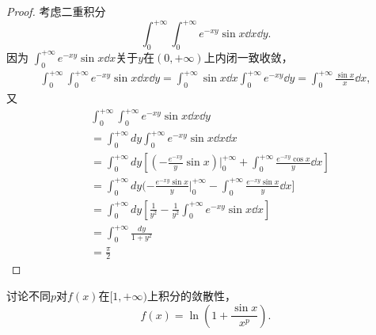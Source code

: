 \begin{proof}
考虑二重积分
$$\int_0^{+\infty}\int_0^{+\infty}e^{-xy}\sin x\dd x\dd y.$$
因为 $\int_0^{+\infty}e^{-xy}\sin x\dd x$关于$y$在$(0,+\infty)$上内闭一致收敛，
\begin{align*}
  \int_0^{+\infty}\int_0^{+\infty}e^{-xy}\sin x\dd x\dd y
  =\int_0^{+\infty}\sin x\dd x\int_0^{+\infty}e^{-xy}\dd y 
  =\int_0^{+\infty}\frac{\sin x}x\dd x,
\end{align*}
  又
\begin{align*}
  &\int_0^{+\infty}\int_0^{+\infty}e^{-xy}\sin x\dd x\dd y\\
  &=\int_0^{+\infty}dy\int_0^{+\infty}e^{-xy}\sin x\dd x\dd x\\
  &=\int_0^{+\infty}dy[(-\frac{e^{-xy}}{y}\sin x)|_0^{+\infty}+\int_0^{+\infty}\frac{e^{-xy}\cos x}{y}\dd x]\\
  &=\int_0^{+\infty}dy(-\frac{e^{-xy}\sin x}{y}|_0^{+\infty}-\int_0^{+\infty}\frac{e^{-xy}\sin x}{y}\dd x]\\
  &=\int_0^{+\infty}dy[\frac{1}{y^2}-\frac{1}{y^2}\int_0^{+\infty}e^{-xy}\sin x\dd x]\\
  &=\int_0^{+\infty}\frac{dy}{1+y^2}\\
  &=\frac{\pi}{2}
\end{align*}   
\end{proof}

\begin{example}
讨论不同$p$对$f(x)$在$[1,+\infty)$上积分的敛散性，$$\displaystyle f(x)=\ln(1+\frac{\sin x}{x^p}).$$
\end{example}

